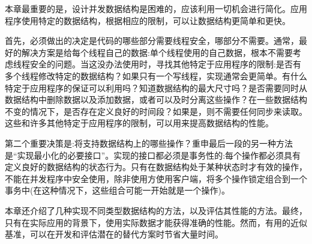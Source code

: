 本章最重要的是，设计并发数据结构是困难的，应该利用一切机会进行简化。应用程序使用特定的数据结构，根据相应的限制，可以让数据结构更简单和更快。 

首先，必须做出的决定是代码的哪些部分需要线程安全，哪部分不需要。通常，最好的解决方案是给每个线程自己的数据:单个线程使用的自己数据，根本不需要考虑线程安全的问题。当这没办法使用时，寻找其他特定于应用程序的限制:是否有多个线程修改特定的数据结构？如果只有一个写线程，实现通常会更简单。有什么特定于应用程序的保证可以利用吗？知道数据结构的最大尺寸吗？是否需要同时从数据结构中删除数据以及添加数据，或者可以及时分离这些操作？在一些数据结构不变的情况下，是否存在定义良好的时间段？如果是，则不需要任何同步来读取。这些和许多其他特定于应用程序的限制，可以用来提高数据结构的性能。 

第二个重要决策是:将支持数据结构上的哪些操作？重申最后一段的另一种方法是“实现最小化的必要接口”。实现的接口都必须是事务性的:每个操作都必须具有定义良好的数据结构的状态行为。只有在数据结构处于某种状态时才有效的操作，不能在并发程序中安全使用，除非使用方使用客户端，将多个操作锁定组合到一个事务中(在这种情况下，这些组合可能一开始就是一个操作)。

本章还介绍了几种实现不同类型数据结构的方法，以及评估其性能的方法。最终，只有在实际应用的背景下，使用实际数据才能获得准确的性能。然而，有用的近似基准，可以在开发和评估潜在的替代方案时节省大量时间。 
